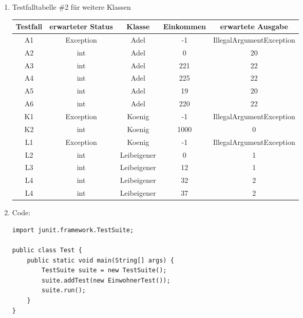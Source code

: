 \documentclass{article}
\begin{document}
\begin{enumerate}[label=(\alph*)]
\begin{lstlisting}[style=java]
}
		\end{lstlisting}
		\item Testfalltabelle \#2 für weitere Klassen
		\begin{center}
			\begin{tabular}{c|c|c|c|c}
				\textbf{Testfall} & \textbf{erwarteter Status} & \textbf{Klasse} & \textbf{Einkommen} & \textbf{erwartete Ausgabe} \\
				\hline
				A1 & Exception & Adel & -1 & IllegalArgumentException \\
				A2 & int & Adel & 0 & 20 \\
				A3 & int & Adel & 221 & 22 \\
				A4 & int & Adel & 225 & 22 \\
				A5 & int & Adel & 19 & 20 \\
				A6 & int & Adel & 220 & 22 \\
				K1 & Exception & Koenig & -1 & IllegalArgumentException \\
				K2 & int & Koenig & 1000 & 0 \\
				L1 & Exception & Koenig & -1 & IllegalArgumentException \\
				L2 & int & Leibeigener & 0 & 1 \\
				L3 & int & Leibeigener & 12 & 1 \\
				L4 & int & Leibeigener & 32 & 2 \\
				L4 & int & Leibeigener & 37 & 2
			\end{tabular}
		\end{center}
		\item Code:
		\begin{lstlisting}[style=java]
import junit.framework.TestSuite;

public class Test {
	public static void main(String[] args) {
		TestSuite suite = new TestSuite();
		suite.addTest(new EinwohnerTest());
		suite.run();
	}
}
		\end{lstlisting}
	\end{enumerate}
	
\end{document}
